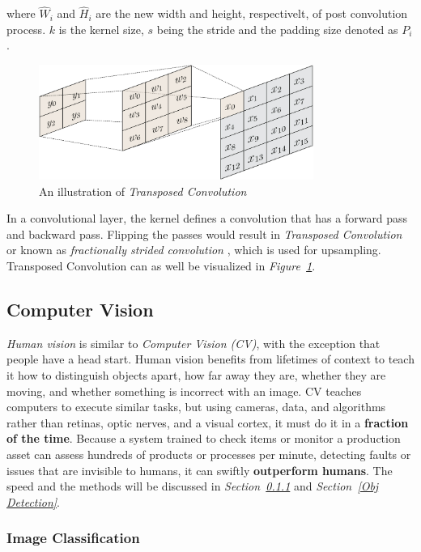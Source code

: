 \documentclass[12pt]{extarticle}
\begin{document}
	where $\hat{W}_i$ and $\hat{H}_i$ are the new width and height, respectivelt, of post convolution process. $k$ is the kernel size, $s$ being the stride and the padding size denoted as $P_i$. 
	
	\begin{figure}[h]
		\centering
		\includegraphics[width=0.8\textwidth]{pics/Figures/reverse_convolution.png}
		\caption{\small{An illustration of \emph{Transposed Convolution}}}
		\label{fig:T_Conv}
	\end{figure}
	
	In a convolutional layer, the kernel defines a convolution that has a forward pass and backward pass. Flipping the passes would result in \emph{Transposed Convolution} or known as \emph{fractionally strided convolution} \cite{stride}, which is used for upsampling. Transposed Convolution can as well be visualized in \emph{Figure~\ref{fig:T_Conv}}.
	\subsection{Computer Vision}\label{CV}
	\emph{Human vision} is similar to \emph{Computer Vision (CV)}, with the exception that people have a head start. Human vision benefits from lifetimes of context to teach it how to distinguish objects apart, how far away they are, whether they are moving, and whether something is incorrect with an image. CV teaches computers to execute similar tasks, but using cameras, data, and algorithms rather than retinas, optic nerves, and a visual cortex, it must do it in a \textbf{fraction of the time}. Because a system trained to check items or monitor a production asset can assess hundreds of products or processes per minute, detecting faults or issues that are invisible to humans, it can swiftly \textbf{outperform humans}. The speed and the methods will be discussed in \emph{Section~\ref{Classification}} and \emph{Section~\ref{Obj Detection}}.
	\subsubsection{Image Classification}\label{Classification}
	
\end{document}
